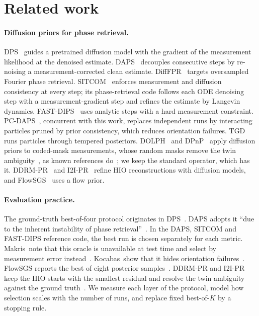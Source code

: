 \section{Related work}
\label{sec:related}

\paragraph{Diffusion priors for phase retrieval.}
DPS~\cite{chung2023dps} guides a pretrained diffusion model with the gradient of the measurement likelihood at the denoised estimate.
DAPS~\cite{zhang2025daps} decouples consecutive steps by re-noising a measurement-corrected clean estimate.
DiffFPR~\cite{li2024difffpr} targets oversampled Fourier phase retrieval.
SITCOM~\cite{alkhouri2025sitcom} enforces measurement and diffusion consistency at every step; its phase-retrieval code follows each ODE denoising step with a measurement-gradient step and refines the estimate by Langevin dynamics.
FAST-DIPS~\cite{kim2026fastdips} uses analytic steps with a hard measurement constraint.
PC-DAPS~\cite{kocabas2026pcdaps}, concurrent with this work, replaces independent runs by interacting particles pruned by prior consistency, which reduces orientation failures.
TGD~\cite{makris2026tgd} runs particles through tempered posteriors.
DOLPH~\cite{shoushtari2022dolph} and DPnP~\cite{xu2024dpnp} apply diffusion priors to coded-mask measurements, whose random masks remove the twin ambiguity~\cite{candes2015cdp}, as known references do~\cite{barmherzig2019holographic}; we keep the standard operator, which has it.
DDRM-PR~\cite{kaya2025ddrmpr} and I2I-PR~\cite{kaya2026i2ipr} refine HIO reconstructions with diffusion models, and FlowSGS~\cite{li2026flowsgs} uses a flow prior.

\paragraph{Evaluation practice.}
The ground-truth best-of-four protocol originates in DPS~\cite{chung2023dps}.
DAPS adopts it ``due to the inherent instability of phase retrieval''~\cite[Sec.~4.1]{zhang2025daps}.
In the DAPS, SITCOM and FAST-DIPS reference code, the best run is chosen separately for each metric.
Makris~\etal note that this oracle is unavailable at test time and select by measurement error instead~\cite[App.~F.4]{makris2026tgd}.
Kocabas~\etal show that it hides orientation failures~\cite{kocabas2026pcdaps}.
FlowSGS reports the best of eight posterior samples~\cite[Sec.~4.3]{li2026flowsgs}.
DDRM-PR and I2I-PR keep the HIO starts with the smallest residual and resolve the twin ambiguity against the ground truth~\cite{kaya2025ddrmpr,kaya2026i2ipr}.
We measure each layer of the protocol, model how selection scales with the number of runs, and replace fixed best-of-$K$ by a stopping rule.

